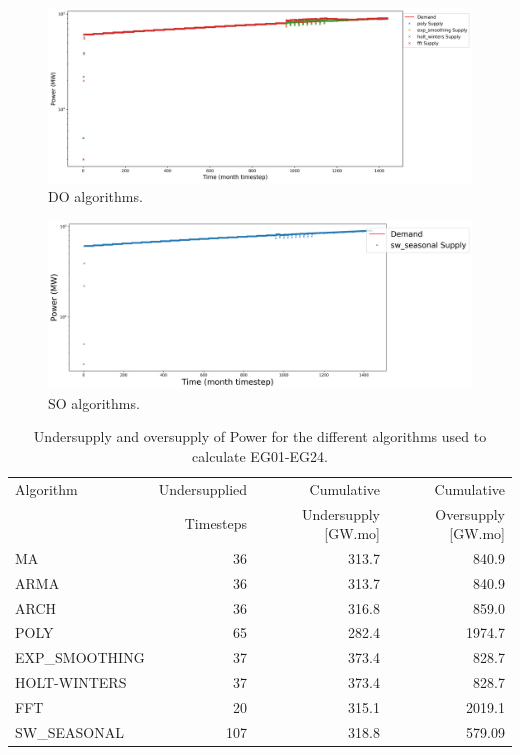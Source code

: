 \documentclass[11pt]{article}
\begin{document}
\begin{figure}[H]
	\centering
	\includegraphics[width=\textwidth]{24-figures/lin-24-power-buffer02.png} 
	\hfill
	\caption{DO algorithms.}
	\label{fig:24-lin-DO}
\end{figure}

\begin{figure}[H]
	\centering
	\includegraphics[width=\textwidth]{24-figures/lin-24-power-buffer03.png} 
	\hfill
	\caption{SO algorithms.}
	\label{fig:24-lin-SO}
\end{figure}

\begin{table}[H]
	\centering
	\caption{Undersupply and oversupply of Power for the different algorithms used to calculate EG01-EG24.}
	\label{tab:24-lin-power}
	\begin{tabularx}{\textwidth}{lRRR}
		\hline
		Algorithm & Undersupplied & Cumulative  & Cumulative \\
		& Timesteps     & Undersupply [GW.mo]  & Oversupply [GW.mo] \\ \hline
		MA        & 36 	& 313.7 & 840.9 \\ 
		ARMA      & 36 	& 313.7 & 840.9 \\ 
		ARCH      & 36 	& 316.8 & 859.0 \\ 
		POLY      &  65 & 282.4 & 1974.7 \\ 
		EXP\_SMOOTHING 	& 37 & 373.4 & 828.7 \\ 
		HOLT-WINTERS  	& 37 & 373.4 & 828.7 \\ 
		FFT       & 20	& 315.1	& 2019.1 \\ 
		SW\_SEASONAL    & 107 & 318.8 & 579.09 \\ \hline
	\end{tabularx}
\end{table}
\end{document}

